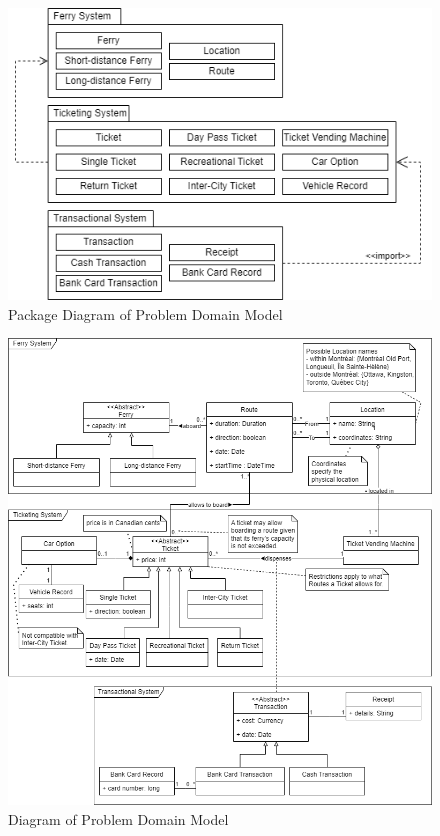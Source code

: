 \documentclass[letterpaper]{report}
\begin{document}
\begin{figure}[ht] %
    \centering
    \includegraphics[width=\textwidth]{ProblemDomainDiagram/Problem Domain Model-Package Diagram of Problem Domain Model.png}
    \caption{Package Diagram of Problem Domain Model}
    \label{fig:problemPackage}
\end{figure}
\begin{figure}[ht]
    \centering
    \includegraphics[width=\textwidth]{ProblemDomainDiagram/Problem Domain Model-Problem Domain Model.png}
    \caption{Diagram of Problem Domain Model}
    \label{fig:problemDomain}
\end{figure}
\clearpage  %
\end{document}
